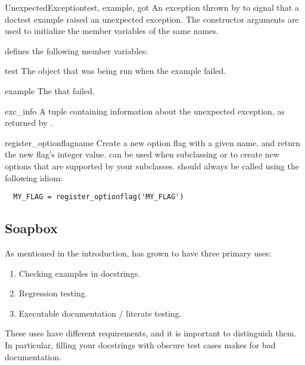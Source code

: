 \begin{excclassdesc}{UnexpectedException}{test, example, got}
    An exception thrown by  to signal that a
    doctest example raised an unexpected exception.  The constructor
    arguments are used to initialize the member variables of the same
    names.
\end{excclassdesc}
 defines the following member variables:
\begin{memberdesc}{test}
    The  object that was being run when the example failed.
\end{memberdesc}
\begin{memberdesc}{example}
    The  that failed.
\end{memberdesc}
\begin{memberdesc}{exc_info}
    A tuple containing information about the unexpected exception, as
    returned by .
\end{memberdesc}

\begin{funcdesc}{register_optionflag}{name}
    Create a new option flag with a given name, and return the new
    flag's integer value.   can be
    used when subclassing  or
     to create new options that are supported by
    your subclasses.   should always be
    called using the following idiom:
\begin{verbatim}
  MY_FLAG = register_optionflag('MY_FLAG')
\end{verbatim}
\end{funcdesc}

\subsection{Soapbox\label{doctest-soapbox}}

As mentioned in the introduction,  has grown to have
three primary uses:

\begin{enumerate}
\item Checking examples in docstrings.
\item Regression testing.
\item Executable documentation / literate testing.
\end{enumerate}

These uses have different requirements, and it is important to
distinguish them.  In particular, filling your docstrings with obscure
test cases makes for bad documentation.

